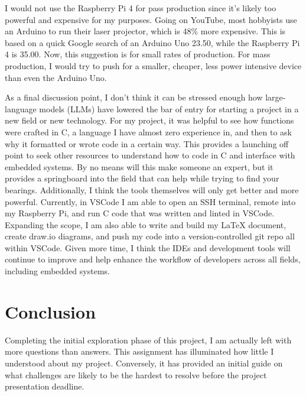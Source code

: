 \documentclass[journal]{IEEEtran}
\begin{document}
    I would not use the Raspberry Pi 4 for pass production since it's likely too powerful and expensive for my purposes. 
    Going on YouTube, most hobbyists use an Arduino to run their laser projector, which is 48\% more expensive. 
    This is based on a quick Google search of an Arduino Uno 23.50, while the Raspberry Pi 4 is 35.00. 
    Now, this suggestion is for small rates of production. For mass production, I would try to push for a smaller, cheaper, less power intensive device than even the Arduino Uno.

    As a final discussion point, I don't think it can be stressed enough how large-language models (LLMs) have lowered the bar of entry for starting a project in a new field or new technology.
    For my project, it was helpful to see how functions were crafted in C, a language I have almost zero experience in, and then to ask why it formatted or wrote code in a certain way. 
    This provides a launching off point to seek other resources to understand how to code in C and interface with embedded systems.
    By no means will this make someone an expert, but it provides a springboard into the field that can help while trying to find your bearings.
    Additionally, I think the tools themselves will only get better and more powerful.
    Currently, in VSCode I am able to open an SSH terminal, remote into my Raspberry Pi, and run C code that was written and linted in VSCode. 
    Expanding the scope, I am also able to write and build my LaTeX document, create draw.io diagrams, and push my code into a version-controlled git repo all within VSCode. 
    Given more time, I think the IDEs and development tools will continue to improve and help enhance the workflow of developers across all fields, including embedded systems.

    \section{Conclusion}
    Completing the initial exploration phase of this project, I am actually left with more questions than answers.
    This assignment has illuminated how little I understood about my project.
    Conversely, it has provided an initial guide on what challenges are likely to be the hardest to resolve before the project presentation deadline.

    \nocite{*}
    \newpage

    
    

    \newpage
\end{document}
